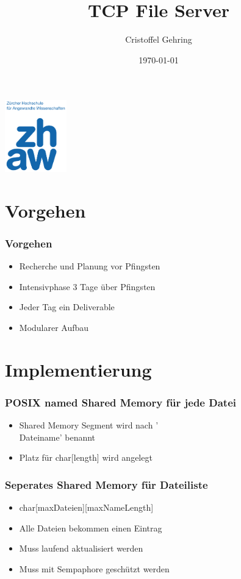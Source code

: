 \documentclass{beamer}
\title[Concurrent C Programming]{TCP File Server}
\author{Cristoffel Gehring}
\institute{ZHAW}
\date{\today}
\begin{document}
\begin{frame}
  \titlepage
  \centering
  \includegraphics[width=0.2\textwidth]{./pics/zhaw.png}
\end{frame}

\begin{frame}
  \tableofcontents
\end{frame}

\section{Vorgehen}
\begin{frame}
  \frametitle{Vorgehen}
  \begin{center}
	\begin{itemize}
	  \item Recherche und Planung vor Pfingsten
	  \item Intensivphase 3 Tage über Pfingsten 
	  \item Jeder Tag ein Deliverable
	  \item Modularer Aufbau
	\end{itemize}
  \end{center}
\end{frame}

\section{Implementierung}
\begin{frame}
  \frametitle{POSIX named Shared Memory für jede Datei}
  \begin{itemize}
	\item Shared Memory Segment wird nach '\\Dateiname' benannt 
	\item Platz für char[length] wird angelegt
  \end{itemize}
\end{frame}

\begin{frame}
  \frametitle{Seperates Shared Memory für Dateiliste}
  \begin{itemize}
	\item char[maxDateien][maxNameLength]
	\item Alle Dateien bekommen einen Eintrag
	\item Muss laufend aktualisiert werden
	\item Muss mit Sempaphore geschützt werden
  \end{itemize}
\end{frame}
\end{document}
